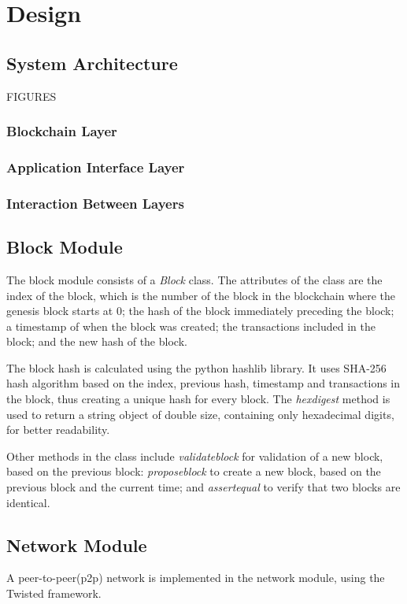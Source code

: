 \chapter{Design}
\section{System Architecture}
FIGURES
\subsection{Blockchain Layer}
\subsection{Application Interface Layer}
\subsection{Interaction Between Layers}


\section{Block Module}
The block module consists of a \textit{Block} class. The attributes of the class are the index of the block, which is the number of the block in the blockchain where the genesis block starts at 0; the hash of the block immediately preceding the block; a timestamp of when the block was created; the transactions included in the block; and the new hash of the block. 

The block hash is calculated using the python hashlib \cite{hashlib} library. It uses SHA-256 hash algorithm based on the index, previous hash, timestamp and transactions in the block, thus creating a unique hash for every block. The \textit{hexdigest} method is used to return a string object of double size, containing only hexadecimal digits, for better readability. 

Other methods in the class include \textit{validate\textunderscore block} for validation of a new block, based on the previous block: \textit{propose\textunderscore block} to create a new block, based on the previous block and the current time; and \textit{assert\textunderscore equal} to verify that two blocks are identical. 


\section{Network Module}
A peer-to-peer(p2p) network is implemented in the network module, using the Twisted \cite{twisted} framework. 

